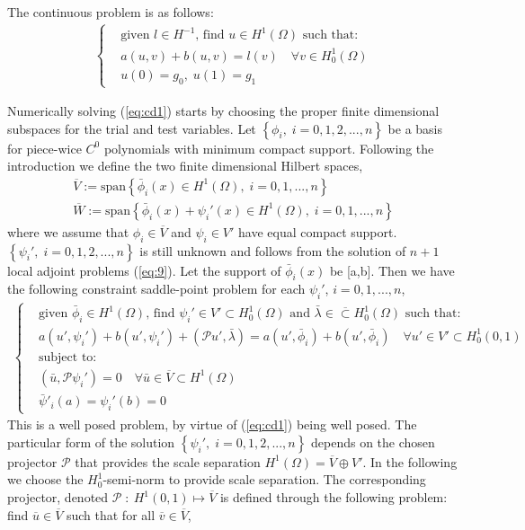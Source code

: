 The continuous problem is as follows:
\begin{align}
\begin{cases} & \text{given $l \in H^{-1}$, find $u \in H^1(\Omega)$ such that: } \\
	& a(u,v) + b(u,v) = l(v) \quad \forall v \in H^1_0(\Omega)  \\
	& u(0) = g_0, \; u(1) = g_1  
\end{cases}
	\label{eq:cd1}
\end{align}

Numerically solving (\ref{eq:cd1}) starts by choosing the proper finite dimensional subspaces for the trial and test variables. Let $\left\{ \phi_i, \; i=0,1,2,...,n \right\}$ be a basis for piece-wice $C^0$ polynomials with minimum compact support. Following the introduction we define the two finite dimensional Hilbert spaces,
\begin{align}
	&  \overline{V} := \mathrm{span} \left\{ \bar{\phi}_i(x) \in H^1(\Omega), \; i=0,1,...,n   \right\} & \\
	&  \overline{W} := \mathrm{span} \left\{ \bar{\phi}_i(x) +  \psi_i'(x) \in H^1(\Omega), \; i=0,1,...,n   \right\} &
\end{align}
where we assume that $\phi_i \in \overline{V}$ and $\psi_i \in V'$ have equal compact support. $\left\{ \psi_i', \; i=0,1,2,...,n \right\}$ is still unknown and follows from the solution of $n+1$ local adjoint problems (\ref{eq:9}). Let the support of $\bar{\phi}_i(x)$ be [a,b]. Then we have the following constraint saddle-point problem for each $\psi_i'$, $i=0,1,...,n$, 
\begin{align}
\begin{cases} & \text{given $\bar{\phi}_i \in H^{1}(\Omega)$, find $\psi_i' \in V' \subset H^1_0 (\Omega)$ and $\bar{\lambda} \in \overline \subset H^1_0 (\Omega)$ such that: } \\
	& a(u',\psi_i') + b(u',\psi_i') + (\mathcal{P} u', \bar{\lambda}) = a(u',\bar{\phi}_i) + b(u', \bar{\phi}_i)  \quad \forall u' \in V' \subset H^1_0(0,1)  \\
	& \text{subject to: } \\
	& (\bar{u}, \mathcal{P} \psi_i') = 0 \quad \forall \bar{u} \in \overline{V} \subset H^1(\Omega) \\
	& \bar{\psi}'_i(a) = \psi_i'(b) = 0  
\end{cases}
		\label{eq:testfun}
\end{align}
This is a well posed problem, by virtue of (\ref{eq:cd1}) being well posed. The particular form of the solution  $\left\{ \psi_i', \; i=0,1,2,...,n \right\}$ depends on the chosen projector $\mathcal{P}$ that provides the scale separation $H^1(\Omega) = \overline{V} \oplus V'$. In the following we choose the $H^1_0$-semi-norm to provide scale separation. The corresponding projector, denoted   $\mathcal{P} \; : \: H^1(0,1) \mapsto \overline{V}$ is defined through the following problem: find $\overline{u} \in \overline{V}$ such that for all $\overline{v} \in \overline{V}$,
